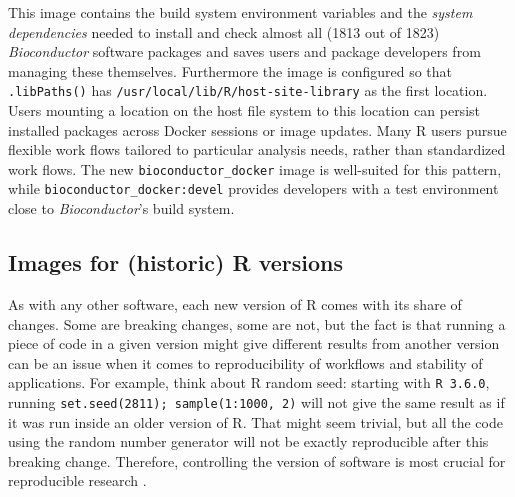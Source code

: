 This image contains the build system environment variables and the
\emph{system dependencies} needed to install and check almost all (1813
out of 1823) \emph{Bioconductor} software packages and saves users and
package developers from managing these themselves. Furthermore the image
is configured so that \texttt{.libPaths()} has
\texttt{/usr/local/lib/R/host-site-library} as the first location. Users
mounting a location on the host file system to this location can persist
installed packages across Docker sessions or image updates. Many R users
pursue flexible work flows tailored to particular analysis needs, rather
than standardized work flows. The new \texttt{bioconductor\_docker}
image is well-suited for this pattern, while
\texttt{bioconductor\_docker:devel} provides developers with a test
environment close to \emph{Bioconductor}'s build system.

\hypertarget{images-for-historic-r-versions}{%
\subsection{Images for (historic) R
versions}\label{images-for-historic-r-versions}}

\label{versions}

As with any other software, each new version of R comes with its share
of changes. Some are breaking changes, some are not, but the fact is
that running a piece of code in a given version might give different
results from another version can be an issue when it comes to
reproducibility of workflows and stability of applications. For example,
think about R random seed: starting with \texttt{R\ 3.6.0}, running
\texttt{set.seed(2811);\ sample(1:1000,\ 2)} will not give the same
result as if it was run inside an older version of R. That might seem
trivial, but all the code using the random number generator will not be
exactly reproducible after this breaking change. Therefore, controlling
the version of software is most crucial for reproducible research
\citep[e.g.][]{boettiger_introduction_2015}.

